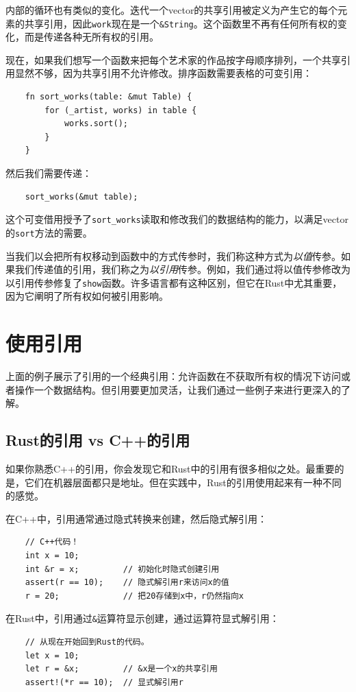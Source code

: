 内部的循环也有类似的变化。迭代一个vector的共享引用被定义为产生它的每个元素的共享引用，因此\texttt{work}现在是一个\texttt{\&String}。这个函数里不再有任何所有权的变化，而是传递各种无所有权的引用。

现在，如果我们想写一个函数来把每个艺术家的作品按字母顺序排列，一个共享引用显然不够，因为共享引用不允许修改。排序函数需要表格的可变引用：
\begin{verbatim}
    fn sort_works(table: &mut Table) {
        for (_artist, works) in table {
            works.sort();
        }
    }
\end{verbatim}

然后我们需要传递：
\begin{verbatim}
    sort_works(&mut table);
\end{verbatim}

这个可变借用授予了\texttt{sort\_works}读取和修改我们的数据结构的能力，以满足vector的\texttt{sort}方法的需要。

当我们以会把所有权移动到函数中的方式传参时，我们称这种方式为\emph{以值}传参。如果我们传递值的引用，我们称之为\emph{以引用}传参。例如，我们通过将以值传参修改为以引用传参修复了\texttt{show}函数。许多语言都有这种区别，但它在Rust中尤其重要，因为它阐明了所有权如何被引用影响。

\section{使用引用}

上面的例子展示了引用的一个经典引用：允许函数在不获取所有权的情况下访问或者操作一个数据结构。但引用要更加灵活，让我们通过一些例子来进行更深入的了解。

\subsection{Rust的引用 vs C++的引用}
如果你熟悉C++的引用，你会发现它和Rust中的引用有很多相似之处。最重要的是，它们在机器层面都只是地址。但在实践中，Rust的引用使用起来有一种不同的感觉。

在C++中，引用通常通过隐式转换来创建，然后隐式解引用：
\begin{verbatim}
    // C++代码！
    int x = 10;
    int &r = x;         // 初始化时隐式创建引用
    assert(r == 10);    // 隐式解引用r来访问x的值
    r = 20;             // 把20存储到x中，r仍然指向x
\end{verbatim}

在Rust中，引用通过\texttt{\&}运算符显示创建，通过\texttt{\*}运算符显式解引用：
\begin{verbatim}
    // 从现在开始回到Rust的代码。
    let x = 10;
    let r = &x;         // &x是一个x的共享引用
    assert!(*r == 10);  // 显式解引用r
\end{verbatim}

